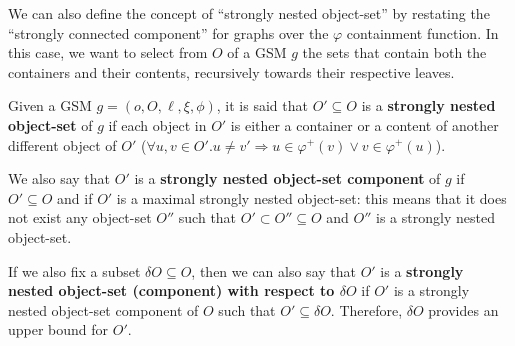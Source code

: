 We can also define the concept of ``strongly nested object-set'' by restating the ``strongly connected component'' for graphs over the $\varphi$ containment function. In this case, we want to select from $O$ of a GSM $g$ the sets that contain both the containers and their contents, recursively towards their respective leaves.

\begin{definition}\label{def:stronglynestedobjectset}
Given a GSM $g=(o,O,\ell,\xi,\phi)$, it is said that $O'\subseteq O$ is a \textbf{strongly nested object-set} of $g$ if each object in $O'$ is either a container or a content of another different object of $O'$ ($\forall u,v\in O'. u\neq v'\Rightarrow u\in\varphi^+(v)\vee v\in\varphi^+(u)$). \medskip

We also say that $O'$ is a \textbf{strongly nested object-set component} of $g$ if $O'\subseteq O$ and if $O'$ is a maximal strongly nested object-set: this means that it does not exist any object-set $O''$ such that $O'\subset O''\subseteq O$ and $O''$ is a strongly nested object-set. \medskip

If we also fix a subset $\delta O\subseteq O$, then we can also say that $O'$ is a \textbf{strongly nested object-set (component) with respect to $\delta O$} if $O'$ is a strongly nested object-set component of $O$ such that $O'\subseteq \delta O$. Therefore, $\delta O$ provides an upper bound for $O'$.
\end{definition}


